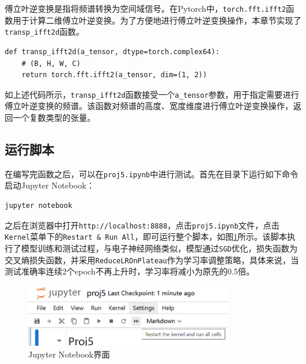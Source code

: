 傅立叶逆变换是指将频谱转换为空间域信号。在Pytorch中，\texttt{torch.fft.ifft2}函数用于计算二维傅立叶逆变换。为了方便地进行傅立叶逆变换操作，本章节实现了\texttt{transp\_ifft2d}函数。

\begin{lstlisting}[style=Python]
def transp_ifft2d(a_tensor, dtype=torch.complex64):
    # (B, H, W, C)
    return torch.fft.ifft2(a_tensor, dim=(1, 2))
\end{lstlisting}

如上述代码所示，\texttt{transp\_ifft2d}函数接受一个\texttt{a\_tensor}参数，用于指定需要进行傅立叶逆变换的频谱。该函数对频谱的高度、宽度维度进行傅立叶逆变换操作，返回一个复数类型的张量。

\subsection{运行脚本}

在编写完函数之后，可以在\texttt{proj5.ipynb}中进行测试。首先在目录下运行如下命令启动Jupyter Notebook：

\begin{lstlisting}[style=Bash]
jupyter notebook
\end{lstlisting}

之后在浏览器中打开\texttt{http://localhost:8888}，点击\texttt{proj5.ipynb}文件，点击\texttt{Kernel}菜单下的\texttt{Restart \& Run All}，即可运行整个脚本，如图\ref{fig:jupyter}所示。该脚本执行了模型训练和测试过程，与电子神经网络类似，模型通过\texttt{SGD}优化，损失函数为交叉熵损失函数，并采用\texttt{ReduceLROnPlateau}作为学习率调整策略，具体来说，当测试准确率连续2个epoch不再上升时，学习率将减小为原先的0.5倍。

\begin{figure}[H]
    \centering
    \includegraphics[width=0.8\textwidth]{pics/jupyter.png}
    \caption{Jupyter Notebook界面}
    \label{fig:jupyter}
\end{figure}
